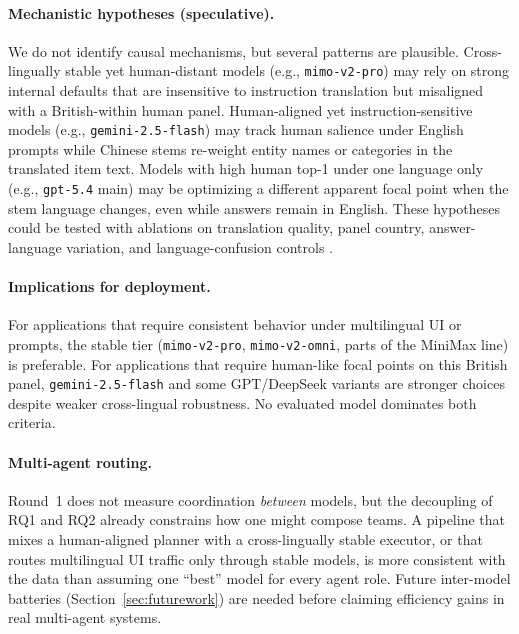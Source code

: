 \documentclass[11pt]{article}
\begin{document}
\paragraph{Mechanistic hypotheses (speculative).}
We do not identify causal mechanisms, but several patterns are plausible. Cross-lingually stable yet human-distant models (e.g., \texttt{mimo-v2-pro}) may rely on strong internal defaults that are insensitive to instruction translation but misaligned with a British-within human panel. Human-aligned yet instruction-sensitive models (e.g., \texttt{gemini-2.5-flash}) may track human salience under English prompts while Chinese stems re-weight entity names or categories in the translated item text. Models with high human top-1 under one language only (e.g., \texttt{gpt-5.4} main) may be optimizing a different apparent focal point when the stem language changes, even while answers remain in English. These hypotheses could be tested with ablations on translation quality, panel country, answer-language variation, and language-confusion controls \cite{marchisio2024language}.

\paragraph{Implications for deployment.}
For applications that require consistent behavior under multilingual UI or prompts, the stable tier (\texttt{mimo-v2-pro}, \texttt{mimo-v2-omni}, parts of the MiniMax line) is preferable. For applications that require human-like focal points on this British panel, \texttt{gemini-2.5-flash} and some GPT/DeepSeek variants are stronger choices despite weaker cross-lingual robustness. No evaluated model dominates both criteria.

\paragraph{Multi-agent routing.}
Round~1 does not measure coordination \emph{between} models, but the decoupling of RQ1 and RQ2 already constrains how one might compose teams. A pipeline that mixes a human-aligned planner with a cross-lingually stable executor, or that routes multilingual UI traffic only through stable models, is more consistent with the data than assuming one ``best'' model for every agent role. Future inter-model batteries (Section~\ref{sec:futurework}) are needed before claiming efficiency gains in real multi-agent systems.
\end{document}
